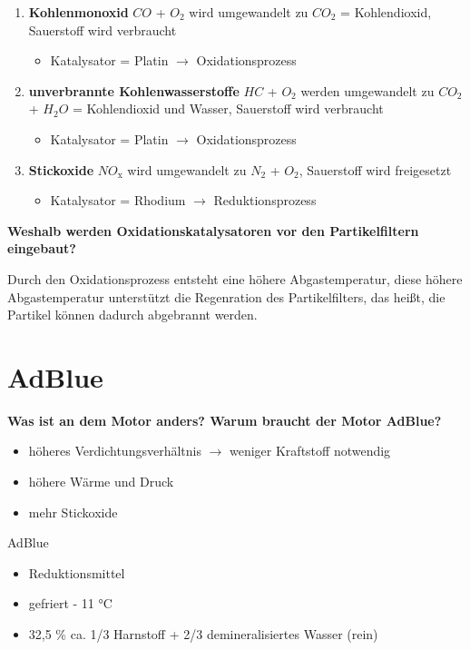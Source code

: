 \begin{enumerate}
\item
  \textbf{Kohlenmonoxid} $CO$ + $O_2$ wird umgewandelt zu $CO_2$ =
  Kohlendioxid, Sauerstoff wird verbraucht

  \begin{itemize}
  \item
    Katalysator = Platin $\to$ Oxidationsprozess
  \end{itemize}
\item
  \textbf{unverbrannte Kohlenwasserstoffe} $HC$ + $O_2$ werden
  umgewandelt zu $CO_2$ + $H_2O$ = Kohlendioxid und Wasser,
  Sauerstoff wird verbraucht

  \begin{itemize}
  \item
    Katalysator = Platin $\to$ Oxidationsprozess
  \end{itemize}
\item
  \textbf{Stickoxide} $NO_\text{x}$ wird umgewandelt zu $N_2$ +
  $O_2$, Sauerstoff wird freigesetzt

  \begin{itemize}
  \item
    Katalysator = Rhodium $\to$ Reduktionsprozess
  \end{itemize}
\end{enumerate}

\textbf{Weshalb werden Oxidationskatalysatoren vor den Partikelfiltern
eingebaut?}

Durch den Oxidationsprozess entsteht eine höhere Abgastemperatur, diese
höhere Abgastemperatur unterstützt die Regenration des Partikelfilters,
das heißt, die Partikel können dadurch abgebrannt werden.

\section{AdBlue}\label{adblue}

\textbf{Was ist an dem Motor anders? Warum braucht der Motor AdBlue?}

\begin{itemize}
\item
  höheres Verdichtungsverhältnis $\to$ weniger Kraftstoff notwendig
\item
  höhere Wärme und Druck
\item
  mehr Stickoxide
\end{itemize}

AdBlue

\begin{itemize}
\item
  Reduktionsmittel
\item
  gefriert - 11 °C
\item
  32,5 \% ca. 1/3 Harnstoff + 2/3 demineralisiertes Wasser (rein)
\end{itemize}

